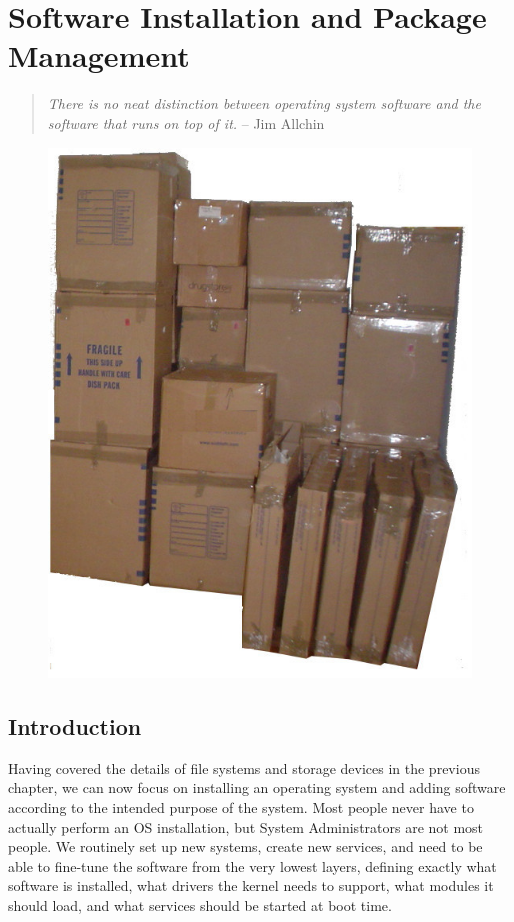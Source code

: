 \chapter{Software Installation and Package Management}
\label{chap:software-installation}

\begin{quote}
{\em There is no neat distinction between operating system software
and the software that runs on top of it.} --
Jim Allchin
\end{quote}

\begin{figure}[hb]
	\raggedleft
	\includegraphics[width=.25\textwidth]{05/pics/many-boxes}
\end{figure}

\section{Introduction}
\label{software-installation:introduction}



Having covered the details of file systems and storage
devices in the previous chapter, we can now focus on
installing an operating system and adding software
according to the intended purpose of the system.  Most
people never have to actually perform an OS
installation, but System Administrators are not most
people.  We routinely set up new systems, create new
services, and need to be able to fine-tune the
software from the very lowest layers, defining exactly
what software is installed, what drivers the kernel
needs to support, what modules it should load, and
what services should be started at boot time.

